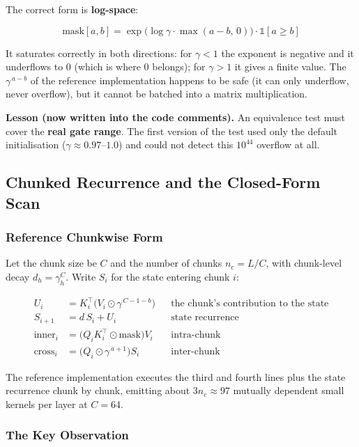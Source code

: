 The correct form is \textbf{log-space}:

\[
\text{mask}[a,b] = \exp\!\big(\log \gamma \cdot \max(a-b,\, 0)\big) \cdot \mathbb{1}[a \ge b]
\]

It saturates correctly in both directions: for $\gamma < 1$ the exponent is negative and
it underflows to $0$ (which is where $0$ belongs); for $\gamma > 1$ it gives a finite
value. The $\gamma^{\,a-b}$ of the reference implementation happens to be safe (it can
only underflow, never overflow), but it cannot be batched into a matrix multiplication.

\begin{notebox}
\textbf{Lesson (now written into the code comments).} An equivalence test must cover the
\textbf{real gate range}. The first version of the test used only the default
initialisation ($\gamma \approx 0.97$--$1.0$) and could not detect this $10^{44}$
overflow at all.
\end{notebox}

\subsection{Chunked Recurrence and the Closed-Form Scan}
\label{sec:en-arch-chunk}

\subsubsection{Reference Chunkwise Form}

Let the chunk size be $C$ and the number of chunks $n_c = L/C$, with chunk-level decay
$d_h = \gamma_h^{C}$. Write $S_i$ for the state entering chunk $i$:

\[
\begin{aligned}
U_i &= K_i^{\top}\big(V_i \odot \gamma^{\,C-1-b}\big)
   &&\text{the chunk's contribution to the state} \\
S_{i+1} &= d\, S_i + U_i &&\text{state recurrence} \\
\text{inner}_i &= \big(Q_i K_i^{\top} \odot \text{mask}\big) V_i &&\text{intra-chunk} \\
\text{cross}_i &= \big(Q_i \odot \gamma^{\,a+1}\big) S_i &&\text{inter-chunk}
\end{aligned}
\]

The reference implementation executes the third and fourth lines plus the state
recurrence chunk by chunk, emitting about $3 n_c \approx 97$ mutually dependent small
kernels per layer at $C = 64$.

\subsubsection{The Key Observation}

